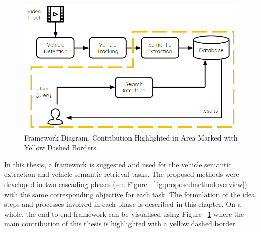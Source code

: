 \begin{figure}[hbt!]\centering
\includegraphics[width=.9\textwidth]{image/new/framework_new.PNG}
\caption{Framework Diagram. Contribution Highlighted in Area Marked with Yellow Dashed Borders.}
\label{fig:framework}
\end{figure}

In this thesis, a framework is suggested and used for the vehicle semantic extraction and vehicle semantic retrieval tasks.
The proposed methods were developed in two cascading phases (see Figure ~\ref{fig:proposedmethodoverview}) with the same corresponding objective for each task.
The formulation of the idea, steps and processes involved in each phase is described in this chapter.
On a whole, the end-to-end framework can be visualised using Figure ~\ref{fig:framework} where the main contribution of this thesis is highlighted with a yellow dashed border.

